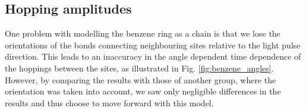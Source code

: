 \subsection{Hopping amplitudes}
One problem with modelling the benzene ring as a chain is that we lose the orientations of the bonds connecting neighbouring sites relative to the light pulse direction.
This leads to an inaccuracy in the angle dependent time dependence of the hoppings between the sites, as illustrated in Fig. \ref{fig:benzene_angles}. However, by comparing the results with those of another group, where the orientation was taken into account, we saw only negligible differences in the results and thus choose to move forward with this model.
    
